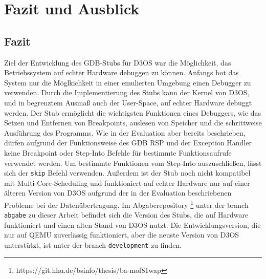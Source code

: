 \chapter{Fazit und Ausblick}

\section{Fazit}
Ziel der Entwicklung des GDB-Stubs für D3OS war die Möglichkeit, das Betriebssystem auf echter Hardware debuggen zu können. Anfangs bot das System nur die Möglkichkeit in einer emulierten Umgebung einen Debugger zu verwenden. Durch die Implementierung des Stubs kann der Kernel von D3OS, und in begrenztem Ausmaß auch der User-Space, auf echter Hardware debuggt werden. Der Stub ermöglicht die wichtigsten Funktionen eines Debuggers, wie das Setzen und Entfernen von Breakpoints, auslesen von Speicher und die schrittweise Ausführung des Programms. Wie in der Evaluation aber bereits beschrieben, dürfen aufgrund der Funktionsweise des GDB RSP und der Exception Handler keine Breakpoint oder Step-Into Befehle für bestimmte Funktionsaufrufe verwendet werden. Um bestimmte Funktionen vom Step-Into auszuschließen, lässt sich der \texttt{skip} Befehl verwenden.
Außerdem ist der Stub noch nicht kompatibel mit Multi-Core-Scheduling und funktioniert auf echter Hardware nur auf einer älteren Version von D3OS aufgrund der in der Evaluation beschriebenen Probleme bei der Datenübertragung. Im Abgaberepository \footnote{https://git.hhu.de/bsinfo/thesis/ba-mof81wap} unter der branch \texttt{abgabe} zu dieser Arbeit befindet sich die Version des Stubs, die auf Hardware funktioniert und einen alten Stand von D3OS nutzt. Die Entwicklungsversion, die nur auf QEMU zuverlässig funktioniert, aber die neuste Version von D3OS unterstützt, ist unter der branch \texttt{development} zu finden.

